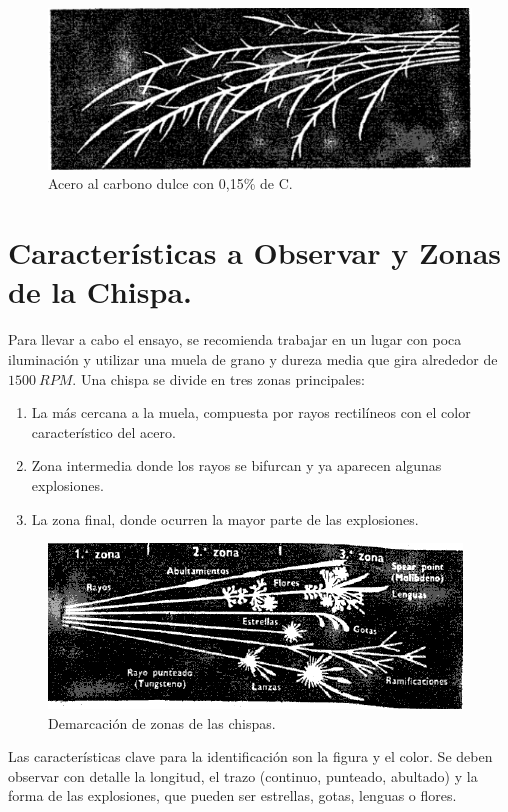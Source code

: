 \documentclass[12pt,a4paper]{article}
\begin{document}
\begin{figure}
    \centering
    \includegraphics[width=0.7\linewidth]{Figuras/Ac_al_C.png}
    \caption{Acero al carbono dulce con 0,15\% de C.}
    \label{fig:0,15}
\end{figure}

\section{Características a Observar y Zonas de la Chispa.}

Para llevar a cabo el ensayo, se recomienda trabajar en un lugar con poca iluminación y utilizar una muela de grano y dureza media que gira alrededor de $1 500\: RPM$. Una chispa se divide en tres zonas principales:

\begin{enumerate}
    \item La más cercana a la muela, compuesta por rayos rectilíneos con el color característico del acero.
    \item Zona intermedia donde los rayos se bifurcan y ya aparecen algunas explosiones.
    \item La zona final, donde ocurren la mayor parte de las explosiones.
\end{enumerate}

\begin{figure}[h]
    \centering
    \includegraphics[width=0.7\linewidth]{Figuras/Zonas.png}
    \caption{Demarcación de zonas de las chispas.}
    \label{zonas}
\end{figure}

Las características clave para la identificación son la figura y el color. Se deben observar con detalle la longitud, el trazo (continuo, punteado, abultado) y la forma de las explosiones, que pueden ser estrellas, gotas, lenguas o flores.
\end{document}
